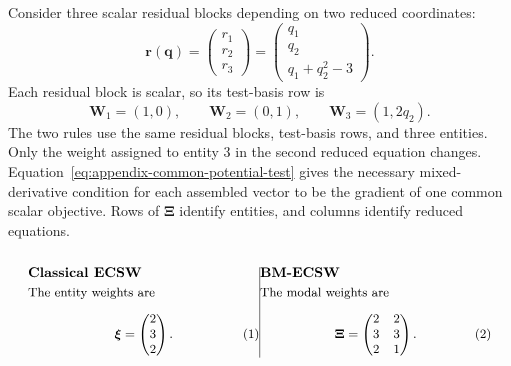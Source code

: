 \documentclass[a4paper,12pt]{article}
\newcommand{\vect}[1]{\boldsymbol{#1}}
\newcommand{\matr}[1]{\boldsymbol{#1}}
\begin{document}
Consider three scalar residual blocks depending on two reduced coordinates:
\begin{equation}
 \vect{r}(\vect{q})
 =\begin{pmatrix}r_1\\r_2\\r_3\end{pmatrix}
 =\begin{pmatrix}q_1\\q_2\\q_1+q_2^2-3\end{pmatrix}.
 \label{eq:appendix-example-residuals}
\end{equation}
Each residual block is scalar, so its test-basis row is
\[
 \matr{W}_1=(1,0),\qquad
 \matr{W}_2=(0,1),\qquad
 \matr{W}_3=(1,2q_2).
\]
The two rules use the same residual blocks, test-basis rows, and three entities. Only the weight assigned to entity 3 in the second reduced equation changes. Equation~\eqref{eq:appendix-common-potential-test} gives the necessary mixed-derivative condition for each assembled vector to be the gradient of one common scalar objective. Rows of $\matr{\Xi}$ identify entities, and columns identify reduced equations.

\begin{subequations}
 \label{eq:appendix-example-weights}
 \noindent
 \begin{minipage}[t]{0.48\linewidth}
  \vspace{0pt}\raggedright
  \textbf{Classical ECSW}\par\smallskip
  \small
  The entity weights are
  \begin{equation}
   \begin{gathered}
    \vect{\xi}=\begin{pmatrix}2\\3\\2\end{pmatrix}.
   \end{gathered}
  \end{equation}
 \end{minipage}\hfill\vrule width 0.4pt\hfill%
 \begin{minipage}[t]{0.48\linewidth}
  \vspace{0pt}\raggedright
  \textbf{BM-ECSW}\par\smallskip
  \small
  The modal weights are
  \begin{equation}
   \begin{gathered}
    \matr{\Xi}=\begin{pmatrix}2&2\\3&3\\2&1\end{pmatrix}.
   \end{gathered}
  \end{equation}
 \end{minipage}
\end{subequations}
\end{document}
